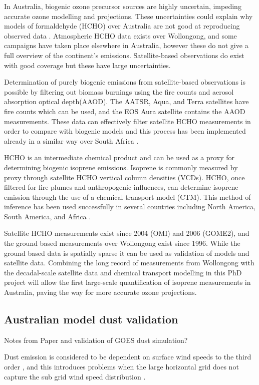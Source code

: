 In Australia, biogenic ozone precursor sources are highly uncertain, impeding accurate ozone modelling and projections. These uncertainties could explain why models of formaldehyde (HCHO) over Australia are not good at reproducing observed data \cite{Stavrakou_2009}. Atmospheric HCHO data exists over Wollongong, and some campaigns have taken place elsewhere in Australia, however these do not give a full overview of the continent's emissions. Satellite-based observations do exist with good coverage but these have large uncertainties. 

Determination of purely biogenic emissions from satellite-based observations is possible by filtering out biomass burnings using the fire counts and aerosol absorption optical depth(AAOD). The AATSR, Aqua, and Terra satellites have fire counts which can be used, and the EOS Aura satellite contains the AAOD measurements. These data can effectively filter satellite HCHO measurements in order to compare with biogenic models and this process has been implemented already in a similar way over South Africa \cite{Marais_2012}.

HCHO is an intermediate chemical product and can be used as a proxy for determining biogenic isoprene emissions. 
Isoprene is commonly measured by proxy through satellite HCHO vertical column densities (VCDs). HCHO, once filtered for fire plumes and anthropogenic influences, can determine isoprene emission through the use of a chemical transport model (CTM).
This method of inference has been used successfully in several countries including North America\cite{Palmer_2003}, South America\cite{Barkley_2013}, and Africa \cite{Marais_2012}.

Satellite HCHO measurements exist since 2004 (OMI) and 2006 (GOME2), and the ground based measurements over Wollongong exist since 1996. While the ground based data is spatially sparse it can be used as validation of models and satellite data. Combining the long record of measurements from Wollongong with the decadal-scale satellite data and chemical transport modelling in this PhD project will allow the first large-scale quantification of isoprene measurements in Australia, paving the way for more accurate ozone projections.

\subsection{Australian model dust validation}
Notes from Paper and validation of GOES dust simulation?
  
Dust emission is considered to be dependent on surface wind speeds to the third order \citep{Duncan_Fairlie_2007}, and this introduces problems when the large horizontal grid does not capture the sub grid wind speed distribution \cite{Ridley_2013}.
  